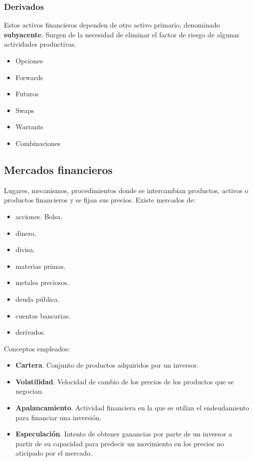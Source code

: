 \documentclass[
10pt, %
a4paper, %
oneside, %
headinclude,footinclude, %
BCOR5mm, %
]{scrartcl}
\newcommand{\n}[1]{\textbf{#1}}
\newcounter{ex}
\begin{document}
		\subsubsection*{Derivados}

			Estos activos financieros dependen de otro activo primario, denominado \n{subyacente}. Surgen de la necesidad de eliminar el factor de riesgo de algunas actividades productivas.

			\begin{multicols}{2}
			\begin{itemize}
				\item Opciones
				\item Forwards
				\item Futuros
				\item Swaps
				\item Warrants
				\item Combinaciones
			\end{itemize}
			\end{multicols}

		\subsection*{Mercados financieros}

			Lugares, mecanismos, procedimientos donde se intercambian productos, activos o productos financieros y se fijan sus precios. 
			Existe mercados de:  
			\begin{multicols}{2}
			\begin{itemize}
				\item acciones. Bolsa.
				\item dinero.
				\item divisa.
				\item materias primas.
				\item metales preciosos.
				\item deuda pública.
				\item cuentas bancarias.
				\item derivados.
			\end{itemize}
			\end{multicols}

			Conceptos empleados:
			\begin{itemize}
				\item \n{Cartera}. Conjunto de productos adquiridos por un inversor.
				\item \n{Volatilidad}. Velocidad de cambio de los precios de los productos que se negocian.
				\item \n{Apalancamiento}. Actividad financiera en la que se utiliza el endeudamiento para financiar una inversión.
				\item \n{Especulación}. Intento de obtener ganancias por parte de un inversor a partir de su capacidad para predecir un movimiento en los precios no aticipado por el mercado.
			\end{itemize}
	\newpage
\end{document}
